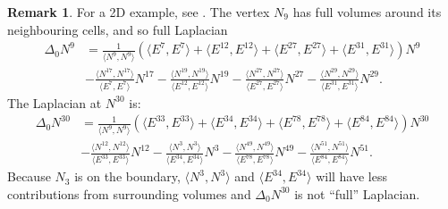 \documentclass{elsarticle}
\theoremstyle{definition}
\newtheorem{remark}[theorem]{Remark}
\newcommand{\inner}[2]{\langle#1,#2\rangle}
\begin{document}
\begin{remark}
  For a 2D example, see . The vertex $N_9$ has full volumes around its neighbouring cells, and so full Laplacian
  \begin{equation*}
    \begin{split}
      \Delta_0 N^9 & =
        \frac{1}{\inner{N^{9}}{N^{9}}}
          (\inner{E^{7}}{E^{7}} + \inner{E^{12}}{E^{12}} + \inner{E^{27}}{E^{27}} + \inner{E^{31}}{E^{31}}) N^9 \\
        & - \frac{\inner{N^{17}}{N^{17}}}{\inner{E^{7}}{E^{7}}} N^{17}
        - \frac{\inner{N^{19}}{N^{19}}}{\inner{E^{12}}{E^{12}}} N^{19}
        - \frac{\inner{N^{27}}{N^{27}}}{\inner{E^{27}}{E^{27}}} N^{27}
        - \frac{\inner{N^{29}}{N^{29}}}{\inner{E^{31}}{E^{31}}} N^{29}.
    \end{split}
  \end{equation*}
  The Laplacian at $N^{30}$ is:
  \begin{equation*}
    \begin{split}
      \Delta_0 N^{30} & =
        \frac{1}{\inner{N^{9}}{N^{9}}}
          (\inner{E^{33}}{E^{33}} + \inner{E^{34}}{E^{34}} + \inner{E^{78}}{E^{78}} + \inner{E^{84}}{E^{84}}) N^{30} \\
        & - \frac{\inner{N^{12}}{N^{12}}}{\inner{E^{33}}{E^{33}}} N^{12}
        - \frac{\inner{N^{3}}{N^{3}}}{\inner{E^{34}}{E^{34}}} N^{3}
        - \frac{\inner{N^{49}}{N^{49}}}{\inner{E^{78}}{E^{78}}} N^{49}
        - \frac{\inner{N^{51}}{N^{51}}}{\inner{E^{84}}{E^{84}}} N^{51}.
    \end{split}
  \end{equation*}
  Because $N_3$ is on the boundary, $\inner{N^{3}}{N^{3}}$ and $\inner{E^{34}}{E^{34}}$ will have less contributions from surrounding volumes and $\Delta_0 N^{30}$ is not ``full'' Laplacian.
\end{remark}
\end{document}
